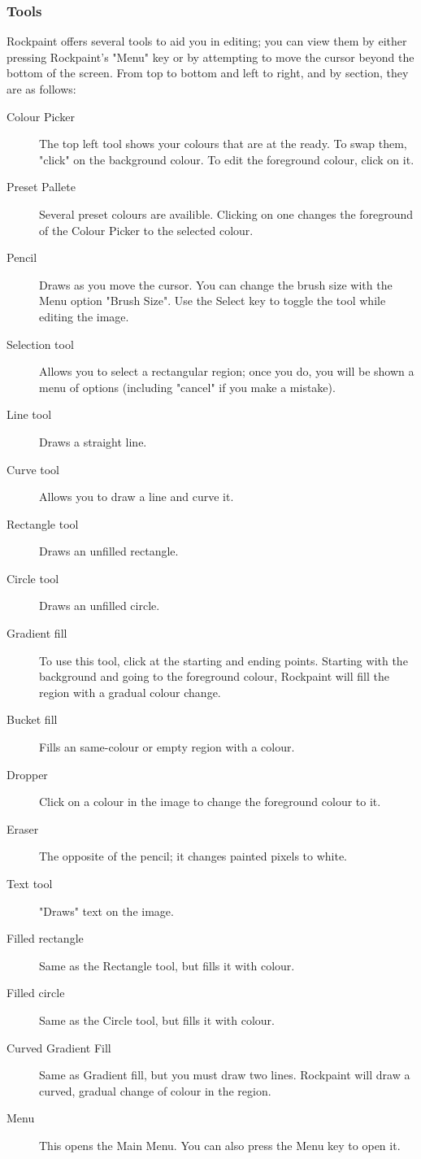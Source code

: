 \subsubsection{Tools}
Rockpaint offers several tools to aid you in editing; you can view them by
either pressing Rockpaint's "Menu" key or by attempting to move the cursor
beyond the bottom of the screen. From top to bottom and left to right, and
by section, they are as follows:
\begin{description}
    \item[Colour Picker]
        The top left tool shows your colours that are at the ready. To
        swap them, "click" on the background colour. To edit the foreground colour,
        click on it.
    \item[Preset Pallete]
        Several preset colours are availible. Clicking on one changes
        the foreground of the Colour Picker to the selected colour.
    \item[Pencil]
        Draws as you move the cursor. You can change the brush size with the
        Menu option "Brush Size". Use the Select key to toggle the tool while editing
        the image.
    \item[Selection tool]
        Allows you to select a rectangular region; once you do, you
        will be shown a menu of options (including "cancel" if you make a mistake).
    \item[Line tool]
        Draws a straight line.
    \item[Curve tool]
        Allows you to draw a line and curve it.
    \item[Rectangle tool]
        Draws an unfilled rectangle.
    \item[Circle tool]
        Draws an unfilled circle.
    \item[Gradient fill]
        To use this tool, click at the starting and ending points.
        Starting with the background and going to the foreground colour, Rockpaint
        will fill the region with a gradual colour change.
    \item[Bucket fill]
        Fills an same-colour or empty region with a colour.
    \item[Dropper]
        Click on a colour in the image to change the foreground colour to it.
    \item[Eraser]
        The opposite of the pencil; it changes painted pixels to white.
    \item[Text tool]
        "Draws" text on the image.
    \item[Filled rectangle]
        Same as the Rectangle tool, but fills it with colour.
    \item[Filled circle]
        Same as the Circle tool, but fills it with colour.
    \item[Curved Gradient Fill]
        Same as Gradient fill, but you must draw two lines.
        Rockpaint will draw a curved, gradual change of colour in the region.
    \item[Menu]
        This opens the Main Menu. You can also press the Menu key to open it.
\end{description}

